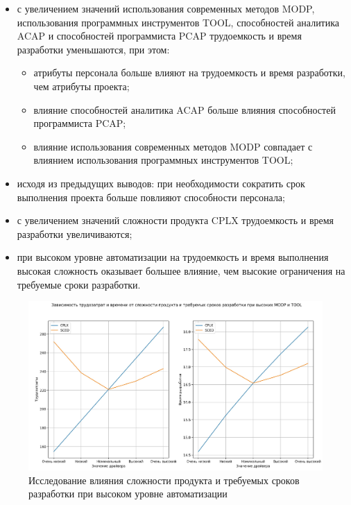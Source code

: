 \begin{itemize}
	\item с увеличением значений использования современных методов MODP, использования программных инструментов TOOL, способностей аналитика ACAP и способностей программиста PCAP трудоемкость и время разработки уменьшаются, при этом:
		\begin{itemize}
			\item атрибуты персонала больше влияют на трудоемкость и время разработки, чем атрибуты проекта;
			\item влияние способностей аналитика ACAP больше влияния способностей программиста PCAP;
			\item влияние использования современных методов MODP совпадает с влиянием использования программных инструментов TOOL;
		\end{itemize}
	\item исходя из предыдущих выводов: при необходимости сократить срок выполнения проекта больше повлияют способности персонала;
	\item с увеличением значений сложности продукта CPLX трудоемкость и время разработки увеличиваются;
	\item при высоком уровне автоматизации на трудоемкость и время выполнения высокая сложность оказывает большее влияние, чем высокие ограничения на требуемые сроки разработки.
\end{itemize}

\begin{figure}[H]
	\begin{center}
		\includegraphics[scale=0.19]{inc/img/task12.jpg}
	\end{center}
	\captionsetup{justification=centering}
	\caption{Исследование влияния сложности продукта и требуемых сроков разработки при высоком уровне автоматизации}
	\label{img:task12}
\end{figure}

